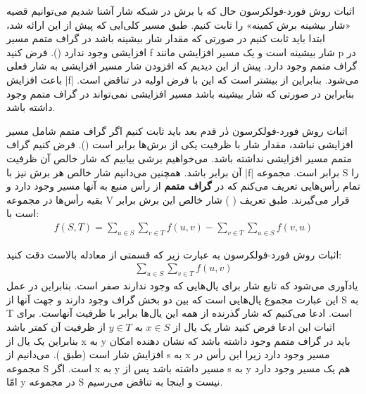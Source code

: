 \begin{itemframe}{اثبات روش فورد-فولکرسون}
\itm
حال که با برش در شبکه شار آشنا شدیم می‌توانیم قضیه «شار بیشینه برش کمینه» را ثابت کنیم. طبق مسیر کلی‌ایی که پیش از این ارائه شد، ابتدا باید ثابت کنیم در صورتی که مقدار شار بیشینه باشد در گراف متمم مسیر افزایشی وجود ندارد ().
\itm
فرض کنید f شار بیشینه است و یک مسیر افزایشی مانند p در گراف متمم وجود دارد. پیش از این دیدیم که افزودن شار مسیر افزایشی به شار فعلی باعث افزایش |f| می‌شود. بنابراین   از  بیشتر است که این با فرض اولیه در تناقض است. بنابراین در صورتی که شار بیشینه باشد مسیر افزایشی نمی‌تواند در گراف متمم وجود داشته باشد.
\end{itemframe}
\begin{itemframe}{اثبات روش فورد-فولکرسون}
\itm
دٰر قدم بعد باید ثابت کنیم اگر گراف متمم شامل مسیر افزایشی نباشد، مقدار شار با ظرفیت یکی از برش‌ها برابر است ().
\itm
فرض کنیم گراف متمم مسیر افزایشی نداشته باشد. می‌خواهیم برشی بیابیم که شار خالص آن  ظرفیت آن برابر باشد. همچنین می‌دانیم شار خالص هر برش نیز با |f| برابر است.
\itm
مجموعه S را تمام رأس‌هایی تعریف می‌کنم که در \textbf{گراف متمم} از رأس منبع به آنها مسیر وجود دارد و بقیه رأس‌ها در مجموعه V قرار می‌گیرند. طبق تعریف (  ) شار خالص این برش برابر است با:
\begin{align*}
f(S, T) = \sum_{u \in S} \sum_{v \in T} f(u, v) - \sum_{v \in T} \sum_{u \in S} f(v, u)
\end{align*}
\end{itemframe}
\begin{itemframe}{اثبات روش فورد-فولکرسون}
\itm
به عبارت زیر که قسمتی از معادله بالاست دقت کنید:
\begin{align*}
\sum_{u \in S} \sum_{v \in T} f(u, v)
\end{align*}
یادآوری می‌شود که تابع شار برای یال‌هایی که وجود ندارند صفر است. بنابراین در عمل این عبارت مجموع یال‌هایی است که بین دو بخش گراف وجود دارند و جهت آنها از S به T است. ادعا می‌کنیم که شار گذرنده از همه این یال‌ها برابر با ظرفیت آنهاست.
\itm
برای اثبات این ادعا فرض کنید شار یک یال از
$x \in S$
به
$y \in T$
از ظرفیت آن کمتر باشد بنابراین یک یال از x به y باید در گراف متمم وجود داشته باشد که نشان دهنده امکان افزایش شار است (طبق ). می‌دانیم از s به x مسیر وجود دارد زیرا این رأس در مجموعه S است. اگر x به y مسیر داشته باشد پس از s به y هم یک مسیر وجود دارد امّا y در مجموعه S نیست و اینجا به تناقض می‌رسیم.

\end{itemframe}
